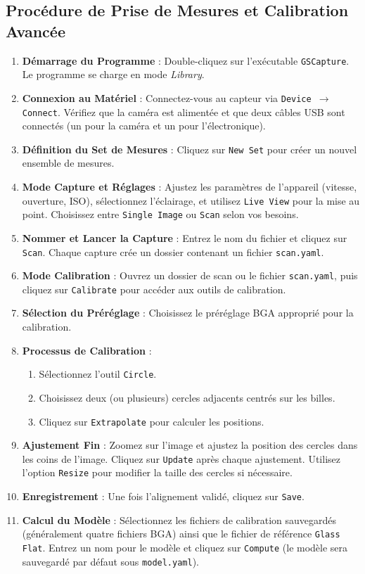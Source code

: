 \documentclass[a4paper,12pt]{article}
\begin{document}
\subsection{Procédure de Prise de Mesures et Calibration Avancée}
\begin{enumerate}
  \item \textbf{Démarrage du Programme} : Double-cliquez sur l'exécutable \texttt{GSCapture}. Le programme se charge en mode \textit{Library}.
  \item \textbf{Connexion au Matériel} : Connectez-vous au capteur via \texttt{Device $\rightarrow$ Connect}. Vérifiez que la caméra est alimentée et que deux câbles USB sont connectés (un pour la caméra et un pour l'électronique).
  \item \textbf{Définition du Set de Mesures} : Cliquez sur \texttt{New Set} pour créer un nouvel ensemble de mesures.
  \item \textbf{Mode Capture et Réglages} : Ajustez les paramètres de l'appareil (vitesse, ouverture, ISO), sélectionnez l'éclairage, et utilisez \texttt{Live View} pour la mise au point. Choisissez entre \texttt{Single Image} ou \texttt{Scan} selon vos besoins.
  \item \textbf{Nommer et Lancer la Capture} : Entrez le nom du fichier et cliquez sur \texttt{Scan}. Chaque capture crée un dossier contenant un fichier \texttt{scan.yaml}.
  \item \textbf{Mode Calibration} : Ouvrez un dossier de scan ou le fichier \texttt{scan.yaml}, puis cliquez sur \texttt{Calibrate} pour accéder aux outils de calibration.
  \item \textbf{Sélection du Préréglage} : Choisissez le préréglage BGA approprié pour la calibration.
  \item \textbf{Processus de Calibration} :
  \begin{enumerate}
    \item Sélectionnez l'outil \texttt{Circle}.
    \item Choisissez deux (ou plusieurs) cercles adjacents centrés sur les billes.
    \item Cliquez sur \texttt{Extrapolate} pour calculer les positions.
  \end{enumerate}
  \item \textbf{Ajustement Fin} : Zoomez sur l'image et ajustez la position des cercles dans les coins de l'image. Cliquez sur \texttt{Update} après chaque ajustement. Utilisez l'option \texttt{Resize} pour modifier la taille des cercles si nécessaire.
  \item \textbf{Enregistrement} : Une fois l'alignement validé, cliquez sur \texttt{Save}.
  \item \textbf{Calcul du Modèle} : Sélectionnez les fichiers de calibration sauvegardés (généralement quatre fichiers BGA) ainsi que le fichier de référence \texttt{Glass Flat}. Entrez un nom pour le modèle et cliquez sur \texttt{Compute} (le modèle sera sauvegardé par défaut sous \texttt{model.yaml}).
\end{enumerate}
\end{document}
